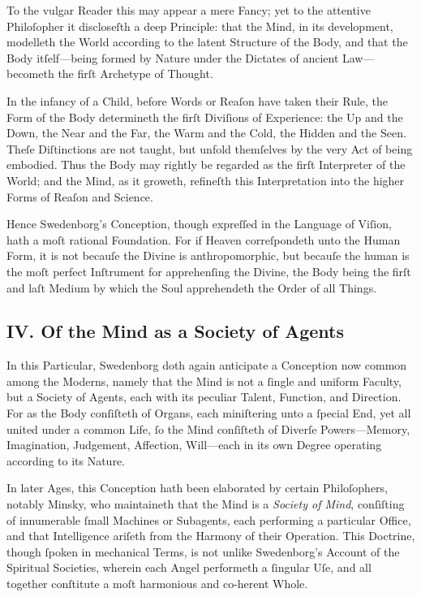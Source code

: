 \documentclass[12pt]{article}
\begin{document}
To the vulgar Reader this may appear a mere Fancy; yet to the attentive 
Philoſopher it discloseſth a deep Principle: that the Mind, in its 
development, modelleth the World according to the latent Structure of the 
Body, and that the Body itſelf—being formed by Nature under the Dictates of 
ancient Law—becometh the firſt Archetype of Thought.

In the infancy of a Child, before Words or Reaſon have taken their Rule, the 
Form of the Body determineth the firſt Diviſions of Experience: the Up and 
the Down, the Near and the Far, the Warm and the Cold, the Hidden and the 
Seen. Theſe Diſtinctions are not taught, but unfold themſelves by the very 
Act of being embodied. Thus the Body may rightly be regarded as the firſt 
Interpreter of the World; and the Mind, as it groweth, refineſth this 
Interpretation into the higher Forms of Reaſon and Science.

Hence Swedenborg’s Conception, though expreſſed in the Language of Viſion, 
hath a moſt rational Foundation. For if Heaven correſpondeth unto the Human 
Form, it is not becauſe the Divine is anthropomorphic, but becauſe the human 
is the moſt perfect Inſtrument for apprehenſing the Divine, the Body being 
the firſt and laſt Medium by which the Soul apprehendeth the Order of all 
Things.

\subsection*{IV. Of the Mind as a Society of Agents}

In this Particular, Swedenborg doth again anticipate a Conception now common 
among the Moderns, namely that the Mind is not a ſingle and uniform Faculty, 
but a Society of Agents, each with its peculiar Talent, Function, and 
Direction. For as the Body conſiſteth of Organs, each miniſtering unto a 
ſpecial End, yet all united under a common Life, ſo the Mind conſiſteth of 
Diverſe Powers—Memory, Imagination, Judgement, Affection, Will—each in its 
own Degree operating according to its Nature.

In later Ages, this Conception hath been elaborated by certain Philoſophers, 
notably Minsky, who maintaineth that the Mind is a \textit{Society of Mind}, 
conſiſting of innumerable ſmall Machines or Subagents, each performing a 
particular Office, and that Intelligence ariſeth from the Harmony of their 
Operation. This Doctrine, though ſpoken in mechanical Terms, is not unlike 
Swedenborg’s Account of the Spiritual Societies, wherein each Angel performeth 
a ſingular Uſe, and all together conſtitute a moſt harmonious and co-herent 
Whole.
\end{document}
